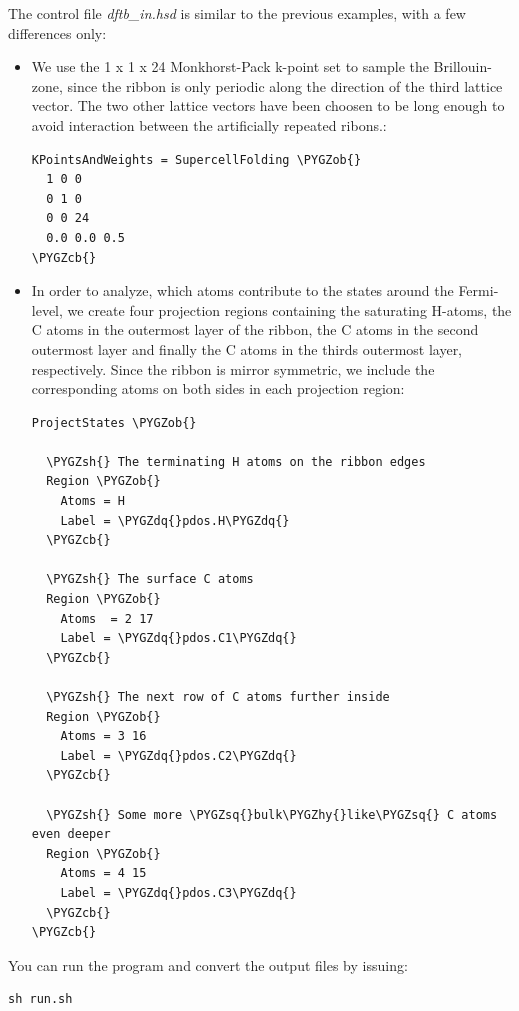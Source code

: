 \documentclass[a4paper,11pt,english]{sphinxmanual}
\def\PYGZob{\char`\{}
\def\PYGZcb{\char`\}}
\def\PYGZsh{\char`\#}
\def\PYGZhy{\char`\-}
\def\PYGZsq{\char`\'}
\def\PYGZdq{\char`\"}
\renewcommand\PYGZsq{\textquotesingle}
\begin{document}
{{The control file \emph{dftb\_in.hsd} is similar to the previous examples,
with a few differences only:
\begin{itemize}
\item {} 
We use the 1 x 1 x 24 Monkhorst-Pack k-point set to sample the
Brillouin-zone, since the ribbon is only periodic along the
direction of the third lattice vector. The two other lattice vectors
have been choosen to be long enough to avoid interaction between the
artificially repeated ribons.:

\begin{Verbatim}[commandchars=\\\{\}]
KPointsAndWeights = SupercellFolding \PYGZob{}
  1 0 0
  0 1 0
  0 0 24
  0.0 0.0 0.5
\PYGZcb{}
\end{Verbatim}

\item {} 
In order to analyze, which atoms contribute to the states around the
Fermi-level, we create four projection regions containing the
saturating H-atoms, the C atoms in the outermost layer of the
ribbon, the C atoms in the second outermost layer and finally the C
atoms in the thirds outermost layer, respectively. Since the ribbon
is mirror symmetric, we include the corresponding atoms on both
sides in each projection region:

\begin{Verbatim}[commandchars=\\\{\}]
ProjectStates \PYGZob{}

  \PYGZsh{} The terminating H atoms on the ribbon edges
  Region \PYGZob{}
    Atoms = H
    Label = \PYGZdq{}pdos.H\PYGZdq{}
  \PYGZcb{}

  \PYGZsh{} The surface C atoms
  Region \PYGZob{}
    Atoms  = 2 17
    Label = \PYGZdq{}pdos.C1\PYGZdq{}
  \PYGZcb{}

  \PYGZsh{} The next row of C atoms further inside
  Region \PYGZob{}
    Atoms = 3 16
    Label = \PYGZdq{}pdos.C2\PYGZdq{}
  \PYGZcb{}

  \PYGZsh{} Some more \PYGZsq{}bulk\PYGZhy{}like\PYGZsq{} C atoms even deeper
  Region \PYGZob{}
    Atoms = 4 15
    Label = \PYGZdq{}pdos.C3\PYGZdq{}
  \PYGZcb{}
\PYGZcb{}
\end{Verbatim}

\end{itemize}

You can run the program and convert the output files by issuing:

\begin{Verbatim}[commandchars=\\\{\}]
sh run.sh
\end{Verbatim}

}}
\end{document}
